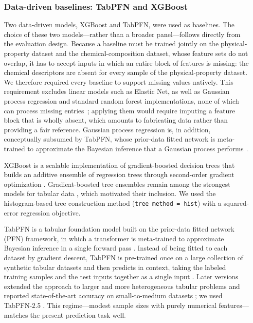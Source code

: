 ﻿\documentclass[a4paper,fleqn]{cas-sc}
\begin{document}
\subsubsection{Data-driven baselines: TabPFN and XGBoost}

Two data-driven models, XGBoost and TabPFN, were used as baselines. The
choice of these two models---rather than a broader panel---follows directly
from the evaluation design. Because a baseline must be trained jointly on the
physical-property dataset and the chemical-composition dataset, whose feature
sets do not overlap, it has to accept inputs in which an entire block of
features is missing: the chemical descriptors are absent for every sample of
the physical-property dataset. We therefore required every baseline to support
missing values natively. This requirement excludes linear models such as
Elastic Net, as well as Gaussian process regression and standard random
forest implementations, none of which can process missing entries~\cite{sklearn_impute_docs, sklearn_release_1_4}; applying
them would require imputing a feature block that is wholly absent, which
amounts to fabricating data rather than providing a fair reference. Gaussian
process regression is, in addition, conceptually subsumed by TabPFN, whose
prior-data fitted network is meta-trained to approximate the Bayesian
inference that a Gaussian process performs~\cite{rasmussen2006gaussian, muller2022transformers}.

XGBoost is a scalable implementation of gradient-boosted decision trees that
builds an additive ensemble of regression trees through second-order gradient
optimization \cite{chen2016xgboost}. Gradient-boosted tree ensembles remain
among the strongest models for tabular data \cite{grinsztajn2022tree}, which
motivated their inclusion. We used the histogram-based tree construction
method (\texttt{tree\_method = hist}) with a squared-error regression
objective.

TabPFN is a tabular foundation model built on the prior-data fitted network
(PFN) framework, in which a transformer is meta-trained to approximate
Bayesian inference in a single forward pass \cite{muller2022transformers}.
Instead of being fitted to each dataset by gradient descent, TabPFN is
pre-trained once on a large collection of synthetic tabular datasets and then
predicts in context, taking the labeled training samples and the test inputs
together as a single input \cite{hollmann2022tabpfn}. Later versions extended
the approach to larger and more heterogeneous tabular problems and reported
state-of-the-art accuracy on small-to-medium datasets
\cite{hollmann2025tabpfn,grinsztajn2025tabpfn25}; we used TabPFN-2.5
\cite{grinsztajn2025tabpfn25}. This regime---modest sample sizes with purely
numerical features---matches the present prediction task well.
\end{document}
